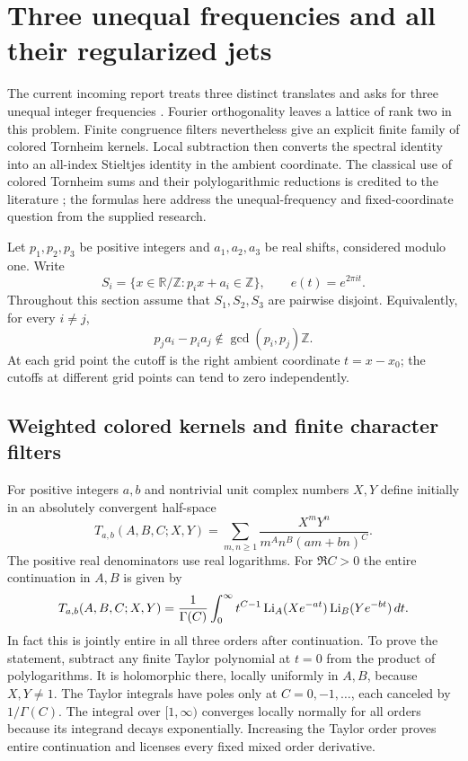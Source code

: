 \section{Three unequal frequencies and all their regularized jets}
\label{xid:sec:triple-dilation}

The current incoming report treats three distinct translates and asks
for three unequal integer frequencies \cite{IncomingIdentities}.
Fourier orthogonality leaves a lattice of rank two in this problem.
Finite congruence filters nevertheless give an explicit finite family
of colored Tornheim kernels.  Local subtraction then converts the
spectral identity into an all-index Stieltjes identity in the ambient
coordinate.  The classical use of colored Tornheim sums and their
polylogarithmic reductions is credited to the literature
\cite{ZhaoColored}; the formulas here address the unequal-frequency
and fixed-coordinate question from the supplied research.

Let $p_1,p_2,p_3$ be positive integers and $a_1,a_2,a_3$ be real
shifts, considered modulo one.  Write
\[
 S_i=\{x\in\mathbb R/\mathbb Z:p_i x+a_i\in\mathbb Z\},
 \qquad e(t)=e^{2\pi i t}.
\]
Throughout this section assume that $S_1,S_2,S_3$ are pairwise
disjoint.  Equivalently, for every $i\ne j$,
\begin{equation}\label{xid:eq:triple-separation}
 p_j a_i-p_i a_j\notin\gcd(p_i,p_j)\mathbb Z.
\end{equation}
At each grid point the cutoff is the right ambient coordinate
$t=x-x_0$; the cutoffs at different grid points can tend to zero
independently.

\subsection{Weighted colored kernels and finite character filters}

For positive integers $a,b$ and nontrivial unit complex numbers $X,Y$
define initially in an absolutely convergent half-space
\begin{equation}\label{xid:eq:weighted-T}
 T_{a,b}(A,B,C;X,Y)
 =\sum_{m,n\ge1}\frac{X^mY^n}{m^A n^B(am+bn)^C}.
\end{equation}
The positive real denominators use real logarithms.  For $\Re C>0$
the entire continuation in $A,B$ is given by
\begin{equation}\label{xid:eq:weighted-T-mellin}
 T_{a,b}(A,B,C;X,Y)
 =\frac1{\Gamma(C)}\int_0^\infty t^{C-1}
        \operatorname{Li}_A(Xe^{-at})\operatorname{Li}_B(Ye^{-bt})\,dt.
\end{equation}
In fact this is jointly entire in all three orders after continuation.
To prove the statement, subtract any finite Taylor polynomial at
$t=0$ from the product of polylogarithms.  It is holomorphic there,
locally uniformly in $A,B$, because $X,Y\ne1$.  The Taylor integrals
have poles only at $C=0,-1,\ldots$, each canceled by $1/\Gamma(C)$.
The integral over $[1,\infty)$ converges locally normally for all
orders because its integrand decays exponentially.  Increasing the
Taylor order proves entire continuation and licenses every fixed
mixed order derivative.

